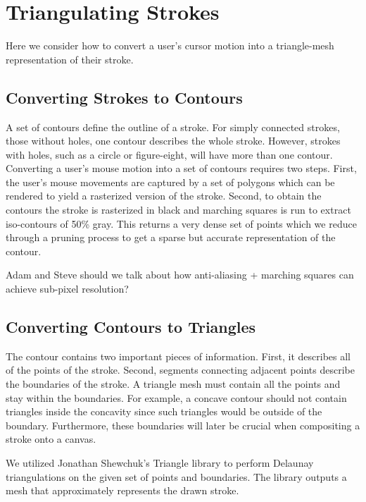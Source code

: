 \documentclass[conference]{acmsiggraph}
\begin{document}
\section{Triangulating Strokes}

Here we consider how to convert a user's cursor motion into a triangle-mesh representation
of their stroke.

\subsection{Converting Strokes to Contours}
A set of contours define the outline of a stroke. For simply connected strokes, those without holes, 
one contour describes the whole stroke. However, strokes with holes, such as a circle or 
figure-eight, will have more than one contour.
Converting a user's mouse motion into a set of contours requires two steps.
First, the user's mouse movements are captured by a set of polygons which can be
rendered to yield a rasterized version of the stroke.
Second, to obtain the contours the stroke is rasterized in black and marching squares
is run to extract iso-contours of 50\% gray. This returns a very dense set of points 
which we reduce through a pruning process to
get a sparse but accurate representation of the contour.


Adam and Steve should we talk about how anti-aliasing + marching squares can achieve sub-pixel
resolution?


\subsection{Converting Contours to Triangles}
The contour contains two important pieces of information. First, it describes all of the points of the stroke.
Second, segments connecting adjacent points describe the boundaries of the stroke. 
A triangle mesh must contain all the points and stay
within the boundaries. For example, a concave contour should not contain triangles inside the concavity since such triangles
would be outside of the boundary.
Furthermore, these boundaries will later be crucial when compositing a stroke onto a canvas.

We utilized Jonathan Shewchuk's Triangle library to perform Delaunay triangulations
on the given set of points and boundaries. The library outputs a mesh that
approximately represents the drawn stroke.
\end{document}
